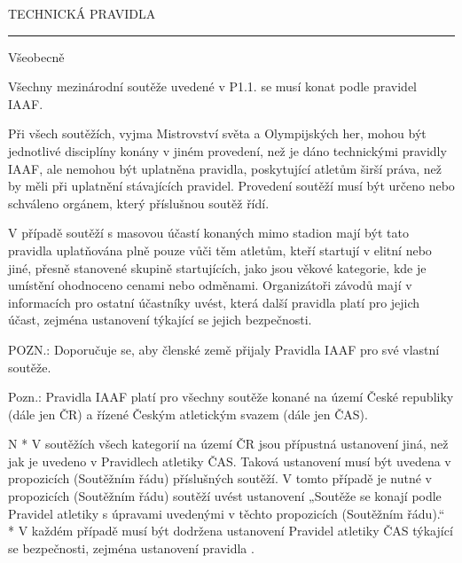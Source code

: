 \chap TECHNICKÁ PRAVIDLA

\rule{99}
\secc Všeobecně

Všechny mezinárodní soutěže uvedené v P1.1. se musí konat podle pravidel IAAF.

Při všech soutěžích, vyjma Mistrovství světa a Olympijských her, mohou být jednotlivé disciplíny konány v jiném provedení, než je dáno technickými pravidly IAAF, ale nemohou být uplatněna pravidla, poskytující atletům širší práva, než by měli při uplatnění stávajících pravidel.
Provedení soutěží musí být určeno nebo schváleno orgánem, který příslušnou soutěž řídí.

V případě soutěží s masovou účastí konaných mimo stadion mají být tato pravidla uplatňována plně pouze vůči těm atletům, kteří startují v elitní nebo jiné, přesně stanovené skupině startujících, jako jsou věkové kategorie, kde je umístění ohodnoceno cenami nebo odměnami.
Organizátoři závodů mají v informacích pro ostatní účastníky uvést, která další pravidla platí pro jejich účast, zejména ustanovení týkající se jejich bezpečnosti.

POZN.: Doporučuje se, aby členské země přijaly Pravidla IAAF pro své vlastní soutěže.

Pozn.: Pravidla IAAF platí pro všechny soutěže konané na území České republiky (dále jen ČR) a řízené Českým atletickým svazem (dále jen ČAS).

\begitems \style N 
* V soutěžích všech kategorií na území ČR jsou přípustná ustanovení jiná, než jak je uvedeno v Pravidlech atletiky ČAS. Taková ustanovení musí být uvedena v propozicích (Soutěžním řádu) příslušných soutěží. V tomto případě je nutné v propozicích (Soutěžním řádu) soutěží uvést ustanovení „Soutěže se konají podle Pravidel atletiky s úpravami uvedenými v těchto propozicích (Soutěžním řádu).“
* V každém případě musí být dodržena ustanovení Pravidel atletiky ČAS týkající se bezpečnosti, zejména ustanovení pravidla .
\enditems









\endinput
